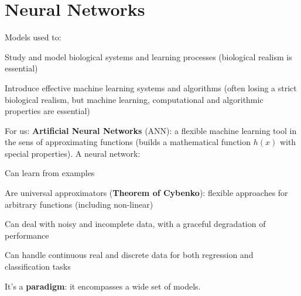 \documentclass[10pt]{report}
\begin{document}
\section{Neural Networks} Models used to:
\begin{list}{}{}
	\item Study and model biological systems and learning processes (biological realism is essential)
	\item Introduce effective machine learning systems and algorithms (often losing a strict biological realism, but machine learning, computational and algorithmic properties are essential)
\end{list}
For us: \textbf{Artificial Neural Networks} (ANN): a flexible machine learning tool in the sens of approximating functions (builds a mathematical function $h(x)$ with special properties). A neural network:
\begin{list}{}{}
	\item Can learn from examples
	\item Are universal approximators (\textbf{Theorem of Cybenko}): flexible approaches for arbitrary functions (including non-linear)
	\item Can deal with noisy and incomplete data, with a graceful degradation of performance
	\item Can handle continuous real and discrete data for both regression and classification tasks
	\item It's a \textbf{paradigm}: it encompasses a wide set of models.
\end{list}
\end{document}
